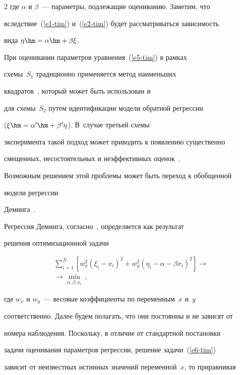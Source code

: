 \begin{multicols}{2}
где $\alpha$ и $\beta$~--- параметры, подлежащие оцениванию. Заметим, что

вследствие~(\ref{e1-tim}) и~(\ref{e2-tim}) будет рассматриваться зависимость

вида $\eta\hm=\alpha\hm+\beta\xi$.



  При оценивании параметров уравнения~(\ref{e5-tim}) в рамках

схемы~$S_1$ традиционно применяется метод наименьших

  квадратов~\cite{1-tim, 5-tim, 7-tim}, который может быть использован и

для схемы~$S_2$ путем идентификации модели обратной регрессии

($\xi\hm= \alpha^\prime\hm+\beta^\prime \eta$). В~случае третьей схемы

эксперимента такой подход может приводить к появлению существенно

смещенных, несостоятельных и неэффективных оценок~\cite{5-tim}.

Возможным решением этой проблемы может быть переход к обобщенной

модели регрессии

  Деминга~\cite{4-tim, 9-tim}.



  Регрессия Деминга, согласно~\cite{4-tim}, определяется как результат

решения оптимизационной задачи

  \begin{multline}

  \sum\limits_{i=1}^N \left[ w^2_x \left( \xi_i-x_i\right)^2 +w_y^2\left( \eta_i-

\alpha -\beta x_i\right)^2 \right] \to{}\\

{}\to \min\limits_{\alpha,\beta,x_i}\,,

  \label{e6-tim}

  \end{multline}

где $w_x$ и $w_y$~--- весовые коэффициенты по переменным~$x$ и~$y$

соответственно. Далее будем полагать, что они постоянны и не зависят от

номера наблюдения. Поскольку, в отличие от стандартной постановки

задачи оценивания параметров регрессии, решение задачи~(\ref{e6-tim})

зависит от неизвестных истинных значений переменной~$x$, то приравнивая


\end{multicols}

